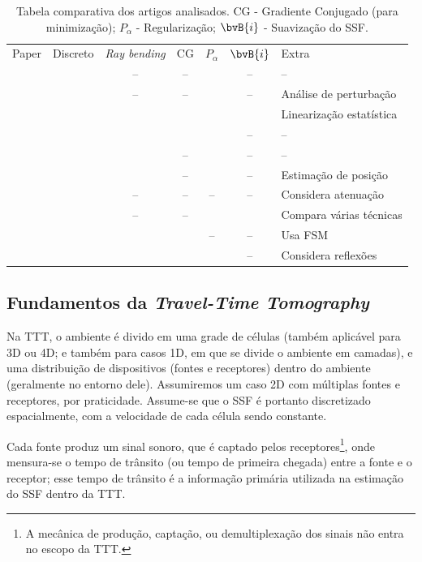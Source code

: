 \begin{table}[!t]\small\centering
	\caption{Tabela comparativa dos artigos analisados. CG - Gradiente Conjugado (para minimização); $P_{\alpha}$ - Regularização; $\bvB{i}$ - Suavização do SSF.}
	\label{table:fttt_revisao_temas}
	\begin{tabular}{l c c c c c l}
		Paper 								& Discreto 	& \textsl{Ray bending} 	& CG 	& $P_{\alpha}$ 	& $\bvB{i}$ & Extra 	\\
		\cite{aki_determination_1976} 		& \X 		& -- 			& --	& \X			& --		& --		\\
		\cite{aki_determination_1977} 		& \X 		& -- 			& --	& \X			& --		& Análise de perturbação		\\
		\cite{ali_opensource_2019}			& \X		& \X			& \X	& \X			& \X		& Linearização estatística \\
		\cite{hormati_robust_2010}			& \X 		& \X			& \X	& \X			& --		& --		\\
		\cite{jeong_investigating_2024}	& \X		& \X			& --	& \X			& --		& --		\\
		\cite{hellmann_borehole_2023}		& \X		& \X			& --	& \X			& --		& Estimação de posição	\\
		\cite{dines_computerized_1979}		& \X		& --			& --	& --			& --		& Considera atenuação\\
		\cite{phillips_traveltime_1991}	& \X		& --			& --	& \X			& \X		& Compara várias técnicas	\\
		\cite{tang_travel_2024}			& \X		& \X			& \X	& --			& --		& Usa FSM \\
		\cite{zhang_inversion_2016}		& \X		& \X			& \X	& \X			& --		& Considera reflexões			
	\end{tabular}
\end{table}

\subsection{Fundamentos da \textsl{Travel-Time Tomography}}
Na TTT, o ambiente é divido em uma grade de células (também aplicável para 3D ou 4D; e também para casos 1D, em que se divide o ambiente em camadas), e uma \gls{distribuição de dispositivos} (fontes e receptores) dentro do ambiente (geralmente no entorno dele). Assumiremos um caso 2D com múltiplas fontes e receptores, por praticidade. Assume-se que o SSF é portanto \gls{discretizado espacialmente}, com a velocidade de cada célula sendo constante.

Cada fonte produz um sinal sonoro, que é captado pelos receptores\footnote{A mecânica de produção, captação, ou demultiplexação dos sinais não entra no escopo da TTT.}, onde mensura-se o \gls{tempo de trânsito} (ou tempo de primeira chegada) entre a fonte e o receptor; esse tempo de trânsito é a informação primária utilizada na estimação do SSF dentro da TTT.

